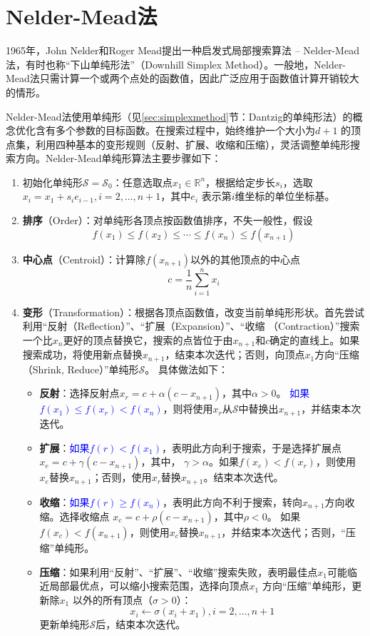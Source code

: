 \section{Nelder-Mead法}
1965年，John Nelder和Roger Mead\cite{nelder1965simplex}提出一种启发式局部搜索算法 -- Nelder-Mead法，有时也称“下山单纯形法”（Downhill Simplex Method）。一般地，Nelder-Mead法只需计算一个或两个点处的函数值，因此广泛应用于函数值计算开销较大的情形。

Nelder-Mead法使用单纯形（见\ref{sec:simplexmethod}节：Dantzig的单纯形法）的概念优化含有多个参数的目标函数。在搜索过程中，始终维护一个大小为$d+1$ 的顶点集，利用四种基本的变形规则（反射、扩展、收缩和压缩），灵活调整单纯形搜索方向。Nelder-Mead单纯形算法主要步骤如下：

\begin{enumerate}
  \item 初始化单纯形$\mathcal{S} = \mathcal{S}_0$：任意选取点$x_1\in \mathbb{R}^n$，根据给定步长$s_i$，选取$x_i = x_1 + s_i e_{i-1},i = 2,\ldots, n+1$，其中$e_i$ 表示第$i$维坐标的单位坐标基。
  \item \textbf{排序}（Order）：对单纯形各顶点按函数值排序，不失一般性，假设
    \[
        f(x_1) \le f(x_2) \le \cdots \le f(x_n) \le f(x_{n+1})
    \]
  \item \textbf{中心点}（Centroid）：计算除$f(x_{n+1})$以外的其他顶点的中心点
    \[
        c = \frac{1}{n} \sum\limits_{i=1}^{n} x_i
    \]
  \item \textbf{变形}（Transformation）：根据各顶点函数值，改变当前单纯形形状。首先尝试利用“反射（Reflection）”、“扩展（Expansion）”、“收缩
  （Contraction）”搜索一个比$x_n$更好的顶点替换它，搜索的点皆位于由$x_{n+1}$和$c$确定的直线上。如果搜索成功，将使用新点替换$x_{n+1}$，结束本次迭代；否则，向顶点$x_1$方向“压缩（Shrink, Reduce）”单纯形$\mathcal{S}$。 具体做法如下：
      \begin{itemize}
        \item \textbf{反射}：选择反射点$x_r = c + \alpha (c - x_{n+1})$，其中$\alpha>0$。
            \textcolor{blue}{如果$f(x_1) \le f(x_r) < f(x_{n})$}，则将使用$x_r$从$\mathcal{S}$中替换出$x_{n+1}$，并结束本次迭代。
        \item \textbf{扩展}：\textcolor{blue}{如果$f(r)<f(x_1)$}，表明此方向利于搜索，于是选择扩展点$x_e = c + \gamma (c - x_{n+1})$，其中，
            $\gamma > \alpha$。如果$f(x_e) < f(x_r)$，则使用$x_e$替换$x_{n+1}$；否则，使用$x_r$替换$x_{n+1}$。结束本次迭代。
        \item \textbf{收缩}：\textcolor{blue}{如果$f(r) \ge f(x_n)$}，表明此方向不利于搜索，转向$x_{n+1}$方向收缩。选择收缩点
            $x_c = c + \rho (c - x_{n+1})$，其中$\rho<0$。
            如果$f(x_c) < f(x_{n+1})$，则使用$x_c$替换$x_{n+1}$，并结束本次迭代；否则，“压缩”单纯形。
        \item \textbf{压缩}：如果利用“反射”、“扩展”、“收缩”搜索失败，表明最佳点$x_1$可能临近局部最优点，可以缩小搜索范围，选择向顶点$x_1$ 方向“压缩”单纯形，更新除$x_1$ 以外的所有顶点（$\sigma > 0$）：
          \[
            x_i \leftarrow \sigma (x_i + x_1), i = 2,\ldots, n+1
          \]
          更新单纯形$\mathcal{S}$后，结束本次迭代。
      \end{itemize}
\end{enumerate}

